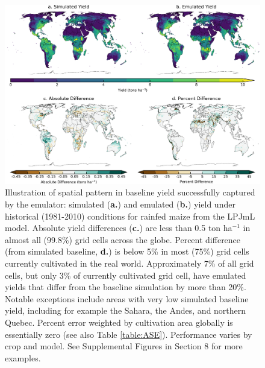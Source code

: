 \documentclass[gmdd]{copernicus} %
\begin{document}
\begin{figure}[ht]
\centering
    \includegraphics[width=16.0cm]{figures/lpjml_maize.png}
    \caption{
    Illustration of spatial pattern in baseline yield successfully captured by the emulator:
    simulated (\textbf{a.}) and emulated (\textbf{b.}) yield under historical (1981-2010) conditions for rainfed maize from the LPJmL model.
    Absolute yield differences (\textbf{c.}) are less than 0.5 ton ha$^{-1}$ in almost all (99.8\%) grid cells across the globe.
    Percent difference (from simulated baseline, \textbf{d.}) is below 5\% in most (75\%) grid cells currently cultivated in the real world.
    Approximately 7\% of all grid cells, but only 3\% of currently cultivated grid cell, have emulated yields that differ from the baseline simulation by more than 20\%.
    Notable exceptions include areas with very low simulated baseline yield, including for example the Sahara, the Andes, and northern Quebec. 
    Percent error weighted by cultivation area globally is essentially zero (see also Table \ref{table:ASE}).
    Performance varies by crop and model. 
    See Supplemental Figures in Section 8 for more examples.
    }
   \label{fig:map_pattern}
\end{figure}
\end{document}

